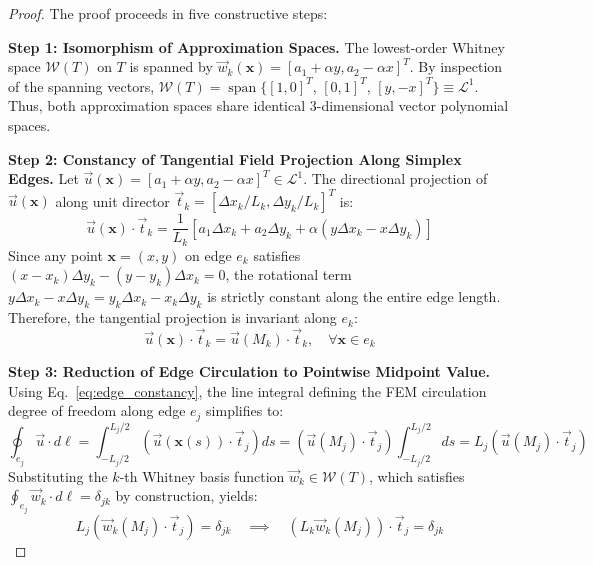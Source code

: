 \documentclass[preprint,12pt]{elsarticle}
\begin{document}
\begin{proof}
The proof proceeds in five constructive steps:

\textbf{Step 1: Isomorphism of Approximation Spaces.} 
The lowest-order Whitney space $\mathcal{W}(T)$ on $T$ is spanned by $\vec{w}_k(\mathbf{x}) = [a_1 + \alpha y, a_2 - \alpha x]^T$. By inspection of the spanning vectors, $\mathcal{W}(T) = \operatorname{span}\{[1,0]^T$, $[0,1]^T$, $[y,-x]^T\} \equiv \mathcal{L}^1$. Thus, both approximation spaces share identical 3-dimensional vector polynomial spaces.

\textbf{Step 2: Constancy of Tangential Field Projection Along Simplex Edges.} 
Let $\vec{u}(\mathbf{x}) = [a_1 + \alpha y, a_2 - \alpha x]^T \in \mathcal{L}^1$. The directional projection of $\vec{u}(\mathbf{x})$ along unit director $\vec{t}_k = [\Delta x_k / L_k, \Delta y_k / L_k]^T$ is:
\begin{equation}
\vec{u}(\mathbf{x}) \cdot \vec{t}_k = \frac{1}{L_k} \left[ a_1 \Delta x_k + a_2 \Delta y_k + \alpha (y \Delta x_k - x \Delta y_k) \right]
\end{equation}
Since any point $\mathbf{x} = (x,y)$ on edge $e_k$ satisfies $(x - x_k)\Delta y_k - (y - y_k)\Delta x_k = 0$, the rotational term $y \Delta x_k - x \Delta y_k = y_k \Delta x_k - x_k \Delta y_k$ is strictly constant along the entire edge length. Therefore, the tangential projection is invariant along $e_k$:
\begin{equation}
\vec{u}(\mathbf{x}) \cdot \vec{t}_k = \vec{u}(M_k) \cdot \vec{t}_k, \quad \forall \mathbf{x} \in e_k
\label{eq:edge_constancy}
\end{equation}

\textbf{Step 3: Reduction of Edge Circulation to Pointwise Midpoint Value.} 
Using Eq.~\eqref{eq:edge_constancy}, the line integral defining the FEM circulation degree of freedom along edge $e_j$ simplifies to:
\begin{equation}
\oint_{e_j} \vec{u} \cdot d\boldsymbol{\ell} = \int_{-L_j/2}^{L_j/2} \left( \vec{u}(\mathbf{x}(s)) \cdot \vec{t}_j \right) ds = \left( \vec{u}(M_j) \cdot \vec{t}_j \right) \int_{-L_j/2}^{L_j/2} ds = L_j \left( \vec{u}(M_j) \cdot \vec{t}_j \right)
\end{equation}
Substituting the $k$-th Whitney basis function $\vec{w}_k \in \mathcal{W}(T)$, which satisfies $\oint_{e_j} \vec{w}_k \cdot d\boldsymbol{\ell} = \delta_{jk}$ by construction, yields:
\begin{equation}
L_j \left( \vec{w}_k(M_j) \cdot \vec{t}_j \right) = \delta_{jk} \quad \implies \quad \left( L_k \vec{w}_k(M_j) \right) \cdot \vec{t}_j = \delta_{jk}
\label{eq:whitney_midpoint_proj}
\end{equation}


\end{proof}
\end{document}
